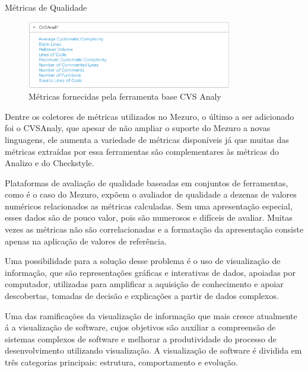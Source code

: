 \begin{section}{Métricas de Qualidade}
\graphicspath{{figuras/}}
\begin{figure}[H]
\centering
\includegraphics[width=0.8\textwidth]{cvsanaly_bt}
\caption{Métricas fornecidas pela ferramenta base CVS Analy}
\label{fig-cvsanaly_bt}
\end{figure}

Dentre os coletores de métricas utilizados no Mezuro, o último a ser adicionado foi o CVSAnaly, que apesar de não ampliar o suporte do Mezuro a novas linguagens, ele aumenta a variedade de métricas disponíveis já que muitas das métricas extraídas por essa ferramentas são complementares às métricas do Analizo e do Checkstyle.

\end{section}

Plataformas de avaliação de qualidade baseadas em conjuntos de ferramentas, como é o caso do Mezuro, expõem o avaliador de qualidade a dezenas de valores numéricos relacionados as métricas calculadas. Sem uma apresentação especial, esses dados são de pouco valor, pois são numerosos e difíceis de avaliar. Muitas vezes as métricas não são correlacionadas e a formatação da apresentação consiste apenas na aplicação de valores de referência.

Uma possibilidade para a solução desse problema é o uso de visualização de informação, que são representações gráficas e interativas de dados, apoiadas por computador, utilizadas para amplificar a aquisição de conhecimento e apoiar descobertas, tomadas de decisão e explicações a partir de dados complexos.

Uma das ramificações da visualização de informação que mais cresce atualmente á a visualização de software, cujos objetivos são auxiliar a compreensão de sistemas complexos de software e melhorar a produtividade do processo de desenvolvimento utilizando visualização. A visualização de software é dividida em três categorias principais: estrutura, comportamento e evolução.


